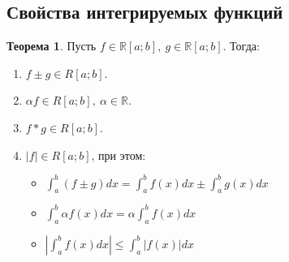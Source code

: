 \documentclass{report}
\theoremstyle{definition}
\newtheorem{theorem}{Теорема}[section]
\begin{document}
\subsection{Свойства интегрируемых функций}

\begin{theorem}
  Пусть $f\in\mathbb{R}[a;b], \ g\in\mathbb{R}[a;b]$. Тогда:
  \begin{enumerate}
    \item $f\pm g \in R[a;b]$.
    \item $\alpha f \in R[a;b], \ \alpha \in \mathbb{R}$.
    \item $f*g\in R[a;b]$.
    \item $|f|\in R[a;b]$, при этом:
          \begin{itemize}
            \item $\int_{a}^{b}(f\pm g)dx = \int_{a}^{b}f(x)dx \pm \int_{a}^{b}g(x)dx$
            \item $\int_{a}^{b}\alpha f(x)dx = \alpha \int_{a}^{b}f(x)dx$
            \item $|\int_{a}^{b}f(x)dx | \leqslant \int_{a}^{b}|f(x)|dx$
          \end{itemize}
  \end{enumerate}
\end{theorem}
\end{document}
